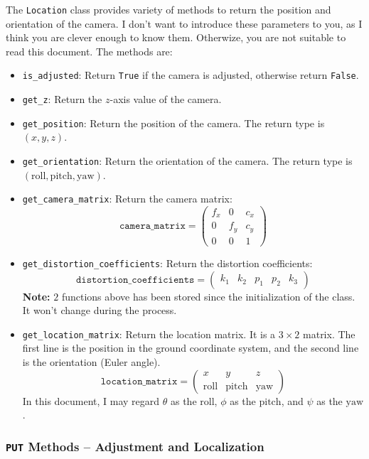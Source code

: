 \documentclass{article}
\begin{document}
The \texttt{Location} class provides variety of methods to return the position and orientation of the camera. I don't want to introduce these parameters to you, as I think you are clever enough to know them. Otherwize, you are not suitable to read this document. The methods are:

\begin{itemize}
  \item \texttt{is\_adjusted}: Return \texttt{True} if the camera is adjusted, otherwise return \texttt{False}.
  \item \texttt{get\_z}: Return the $z$-axis value of the camera.
  \item \texttt{get\_position}: Return the position of the camera. The return type is $\left(x,y,z\right)$.
  \item \texttt{get\_orientation}: Return the orientation of the camera. The return type is $\left(\mathrm{roll},\mathrm{pitch},\mathrm{yaw}\right)$.
  \item \texttt{get\_camera\_matrix}: Return the camera matrix:
  \[
    \texttt{camera\_matrix}=\left(\begin{matrix}
      f_x & 0 & c_x \\
      0 & f_y & c_y \\
      0 & 0 & 1
    \end{matrix}\right)
  \]
  \item \texttt{get\_distortion\_coefficients}: Return the distortion coefficients:
  \[
    \texttt{distortion\_coefficients}=\left(\begin{matrix}
      k_1 & k_2 & p_1 & p_2 & k_3
    \end{matrix}\right)
  \]
  \textbf{Note: } $2$ functions above has been stored since the initialization of the class. It won't change during the process.
  \item \texttt{get\_location\_matrix}: Return the location matrix. It is a $3\times2$ matrix. The first line is the position in the ground coordinate system, and the second line is the orientation (Euler angle).
  \[
    \texttt{location\_matrix}=\left(\begin{matrix}
      x & y & z \\
      \mathrm{roll} & \mathrm{pitch} & \mathrm{yaw}
    \end{matrix}\right)
  \]
  In this document, I may regard $\theta$ as the $\mathrm{roll}$, $\phi$ as the $\mathrm{pitch}$, and $\psi$ as the $\mathrm{yaw}$.
\end{itemize}

\subsubsection{\texttt{PUT} Methods -- Adjustment and Localization}
\end{document}
